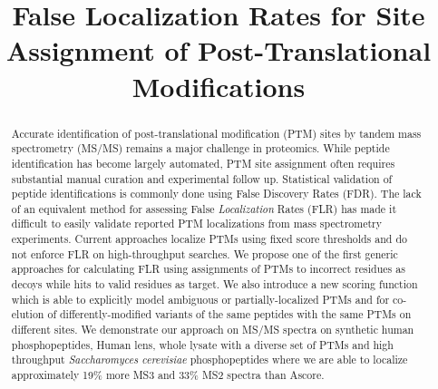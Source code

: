 \documentclass[11pt]{article}
\begin{document}
\title{False Localization Rates for Site Assignment of Post-Translational Modifications}


\date{}
\maketitle

\begin{abstract}
Accurate identification of post-translational modification (PTM) sites by tandem mass spectrometry (MS/MS) remains a major challenge in proteomics. While peptide identification has become largely automated, PTM site assignment often requires substantial manual curation and experimental follow up. Statistical validation of peptide identifications is commonly done using False Discovery Rates (FDR). The lack of an equivalent method for assessing False \emph{Localization} Rates (FLR) has made it difficult to easily validate reported PTM localizations from mass spectrometry experiments. Current approaches localize PTMs using fixed score thresholds and do not enforce FLR on high-throughput searches. We propose one of the first generic approaches for calculating FLR using assignments of PTMs to incorrect residues as decoys while hits to valid residues as target. We also introduce a new scoring function which is able to explicitly model ambiguous or partially-localized PTMs and for co-elution of differently-modified variants of the same peptides with the same PTMs on different sites. We demonstrate our approach on MS/MS spectra on synthetic human phosphopeptides, Human lens, whole lysate with a diverse set of PTMs and high throughput \emph{Saccharomyces  cerevisiae}  phosphopeptides where we are able to localize approximately 19\% more MS3 and 33\% MS2 spectra than Ascore.


\end{abstract}
\end{document}
